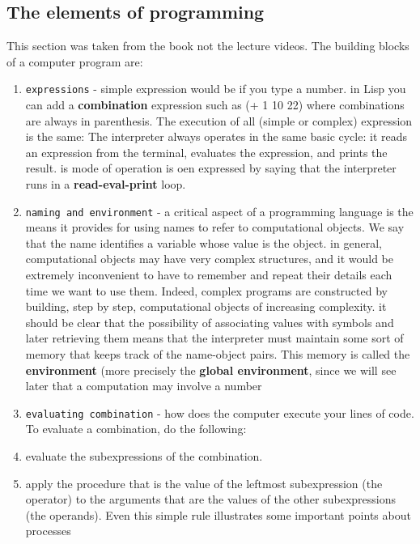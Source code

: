 \documentclass[a4paper,twoside]{article}
\numberwithin{equation}{section}
\begin{document}
\subsection{The elements of programming}
This section was taken from the book not the lecture videos. The building blocks of a computer program are:
\begin{enumerate}
    \item \texttt{expressions} - simple expression would be if you type a number. in Lisp you can add
          a \textbf{combination} expression such as (+ 1 10 22) where combinations are always in
          parenthesis.
          The execution of all (simple or complex) expression is the same: The interpreter always operates
          in the same basic cycle: it reads an expression from the terminal, evaluates the expression,
          and prints the result. is mode of operation is oen
          expressed by saying that the interpreter runs in a \textbf{read-eval-print} loop.
    \item \texttt{naming and environment} - a critical aspect of a programming language is the means
          it provides for using names to refer to computational objects. We say that the name
          identifies a variable whose value is the object.
          in general, computational objects may have very complex structures, and it would be extremely
          inconvenient to have to remember and repeat their details each time we want to use them.
          Indeed, complex programs are constructed
          by building, step by step, computational objects of increasing complexity.
          it should be clear that the possibility of associating values with symbols and later
          retrieving them means that the
          interpreter must maintain some sort of memory that keeps track of the name-object pairs.
          This memory is called the \textbf{environment} (more precisely the \textbf{global environment},
          since we will see later that a computation may involve a number
    \item \texttt{evaluating combination} - how does the computer execute your lines of code.
          To evaluate a combination, do the following:
    \item evaluate the subexpressions of the combination.
    \item apply the procedure that is the value of the leftmost subexpression (the operator) to the
          arguments that are the values of the other subexpressions (the operands).
          Even this simple rule illustrates some important points about processes

\end{enumerate}
\end{document}
